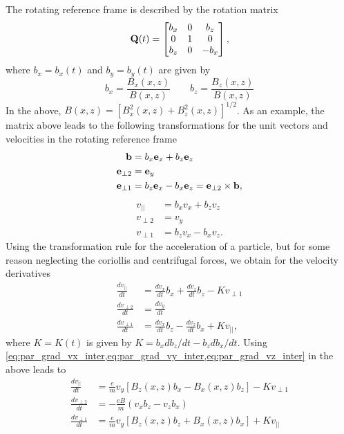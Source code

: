 \documentclass[a4paper,11pt]{report}
\begin{document}
The rotating reference frame is described by the rotation matrix
\begin{equation}
    \mathbf{Q}(t) = \begin{bmatrix} b_x & 0 & b_z \\ 0 & 1 & 0 \\ b_z & 0 & -b_x \end{bmatrix},
\end{equation}
where $b_x = b_x(t)$ and $b_y = b_y(t)$ are given by
\begin{equation}
    b_x = \frac{B_x(x,z)}{B(x,z)} \qquad b_z = \frac{B_z(x,z)}{B(x,z)} \label{eq:bvec_components}
\end{equation}
In the above, $B(x,z) = [ B_x^2(x,z) + B_z^2(x,z) ]^{1/2}$. As an example, the matrix above leads to the following transformations for the unit vectors and velocities in the rotating reference frame 
\begin{align}
    \mathbf{b} &= b_x \mathbf{e}_x + b_z \mathbf{e}_z \\
    \mathbf{e}_{\perp2} &= \mathbf{e}_y \\
    \mathbf{e}_{\perp1} &= b_z \mathbf{e}_x - b_x \mathbf{e}_z = \mathbf{e}_{\perp2} \times \mathbf{b},
\end{align}
\begin{align}
    v_{||} &= b_x v_x + b_z v_z \label{eq:par_grad_vel_trans_1}\\
    v_{\perp2} &= v_y \label{eq:par_grad_vel_trans_2}\\
    v_{\perp1} &= b_z v_x - b_x v_z. \label{eq:par_grad_vel_trans_3}
\end{align}
Using the transformation rule for the acceleration of a particle, but for some reason neglecting the coriollis and centrifugal forces, we obtain for the velocity derivatives
\begin{align}
    \frac{dv_{||}}{dt} &= \frac{dv_x}{dt} b_x + \frac{dv_z}{dt} b_z  - K v_{\perp1} \\
    \frac{dv_{\perp2}}{dt} &= \frac{dv_y}{dt}\\
    \frac{dv_{\perp1}}{dt} &= \frac{dv_x}{dt} b_z - \frac{dv_z}{dt} b_x + K v_{||},
\end{align}
where $K = K(t)$ is given by $K = b_x db_z/dt - b_z db_x/dt$. Using \cref{eq:par_grad_vx_inter,eq:par_grad_vy_inter,eq:par_grad_vz_inter} in the above leads to
\begin{align}
    \frac{d v_{||}}{dt} &= \frac{e}{m} v_y [B_z(x,z) b_x - B_x(x,z) b_z] - Kv_{\perp1} \\
    \frac{dv_{\perp2}}{dt} &= -\frac{eB}{m} (v_x b_z - v_z b_x) \\
    \frac{dv_{\perp1}}{dt} &= \frac{e}{m} v_y [B_z(x,z) b_z + B_x(x,z) b_x] + Kv_{||} 
\end{align}
\end{document}
